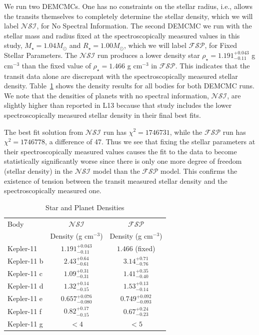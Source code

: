 \documentclass[oneside]{emulateapj}
\begin{document}
We run two DEMCMCs. One has no constraints on the stellar radius, i.e., allows the transits themselves to completely determine the stellar density, which we will label $\mathcal{NSI}$, for No Spectral Information. The second DEMCMC we run with the stellar mass and radius fixed at the spectroscopically measured values in this study, $M_\star=1.04M_\odot$ and $R_\star=1.00M_\odot$, which we will label $\mathcal{FSP}$, for Fixed Stellar Parameters. The $\mathcal{NSI}$ run produces a lower density star $\rho_\star = 1.191^{+0.043}_{-0.11}$ g cm$^{-3}$ than the fixed value of $\rho_\star = 1.466$ g cm$^{-3}$ in $\mathcal{FSP}$. This indicates that the transit data alone are discrepant with the spectroscopically measured stellar density. Table~\ref{table:den} shows the density results for all bodies for both DEMCMC runs. We note that the densities of planets with no spectral information, $\mathcal{NSI}$, are slightly higher than reported in L13 because that study includes the lower spectroscopically measured stellar density in their final best fits.

The best fit solution from $\mathcal{NSI}$ run has $\chi^2 = 1746731$, while the $\mathcal{FSP}$ run has $\chi^2 = 1746778$, a difference of 47. Thus we see that fixing the stellar parameters at their spectroscopically measured values causes the fit to the \Kepler data to become statistically significantly worse since there is only one more degree of freedom (stellar density) in the $\mathcal{NSI}$ model than the $\mathcal{FSP}$ model. This confirms the existence of tension between the transit measured stellar density and the spectroscopically measured one.  

\begin{table}
\caption{Star and Planet Densities}
\label{table:den}
\centering 
\begin{tabular}{l c c} 
\hline
Body & $\mathcal{NSI}$ & $\mathcal{FSP}$  \\
 & Density (g cm$^{-3}$)  & Density (g cm$^{-3}$) \\
\hline
Kepler-11    & $1.191^{+0.043}_{-0.11} $& $1.466 $ (fixed) \\
Kepler-11 b & $2.43^{+0.64}_{-0.61} $ & $ 3.14^{+0.71}_{-0.76} $  \\
Kepler-11 c &  $ 1.09^{+0.31}_{-0.31} $ &$ 1.41^{+0.35}_{-0.40} $ \\
Kepler-11 d &  $ 1.32^{+0.14}_{-0.15} $ & $ 1.53^{+0.13}_{-0.14} $ \\
Kepler-11 e &  $ 0.657^{+0.076}_{-0.080} $ & $ 0.749^{+0.092}_{-0.093} $ \\
Kepler-11 f &  $ 0.82^{+0.17}_{-0.15} $  &$ 0.67^{+0.24}_{-0.23} $  \\
Kepler-11 g &  $ <  4 $ & $ < 5 $\\
\hline       
\end{tabular}

\end{table}
\end{document}

